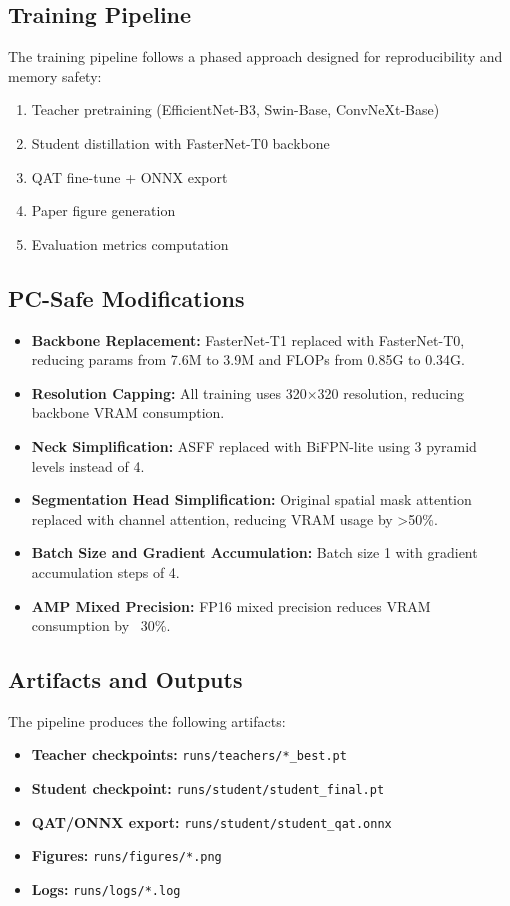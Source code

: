 \documentclass[10pt,a4paper,twocolumn]{article}
\begin{document}
\subsection{Training Pipeline}

The training pipeline follows a phased approach designed for reproducibility and memory safety:
\begin{enumerate}
    \item Teacher pretraining (EfficientNet-B3, Swin-Base, ConvNeXt-Base)
    \item Student distillation with FasterNet-T0 backbone
    \item QAT fine-tune + ONNX export
    \item Paper figure generation
    \item Evaluation metrics computation
\end{enumerate}

\subsection{PC-Safe Modifications}

\begin{itemize}
    \item \textbf{Backbone Replacement:} FasterNet-T1 replaced with FasterNet-T0, reducing params from 7.6M to 3.9M and FLOPs from 0.85G to 0.34G.
    \item \textbf{Resolution Capping:} All training uses 320$\times$320 resolution, reducing backbone VRAM consumption.
    \item \textbf{Neck Simplification:} ASFF replaced with BiFPN-lite using 3 pyramid levels instead of 4.
    \item \textbf{Segmentation Head Simplification:} Original spatial mask attention replaced with channel attention, reducing VRAM usage by >50\%.
    \item \textbf{Batch Size and Gradient Accumulation:} Batch size 1 with gradient accumulation steps of 4.
    \item \textbf{AMP Mixed Precision:} FP16 mixed precision reduces VRAM consumption by ~30\%.
\end{itemize}

\subsection{Artifacts and Outputs}

The pipeline produces the following artifacts:
\begin{itemize}
    \item \textbf{Teacher checkpoints:} \texttt{runs/teachers/*\_best.pt}
    \item \textbf{Student checkpoint:} \texttt{runs/student/student\_final.pt}
    \item \textbf{QAT/ONNX export:} \texttt{runs/student/student\_qat.onnx}
    \item \textbf{Figures:} \texttt{runs/figures/*.png}
    \item \textbf{Logs:} \texttt{runs/logs/*.log}
\end{itemize}
\end{document}
